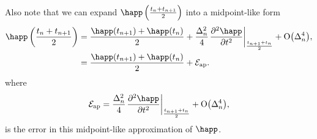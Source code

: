 Also note that we can expand $\mphapp$ into a midpoint-like form
\begin{equation}
  \begin{aligned}
  \mphapp &= \frac{\happ(t_{n+1}) + \happ(t_n)}{2} 
  + \frac{\dtn^2}{4} \evalatb{\spd{\happ}{t}}{\frac{t_{n+1} + t_n}{2}}  + \order{\dtn^4}, \\
  &= \frac{\happ(t_{n+1}) + \happ(t_n)}{2} + \happerror.\\
  \label{eq:happ-midpoint}
\end{aligned}
\end{equation}
where
\begin{equation}
  \happerror = \frac{\dtn^2}{4} \evalatb{\spd{\happ}{t}}{\frac{t_{n+1} + t_n}{2}}  + \order{\dtn^4},
\end{equation}
is the error in this midpoint-like approximation of $\happ$.


